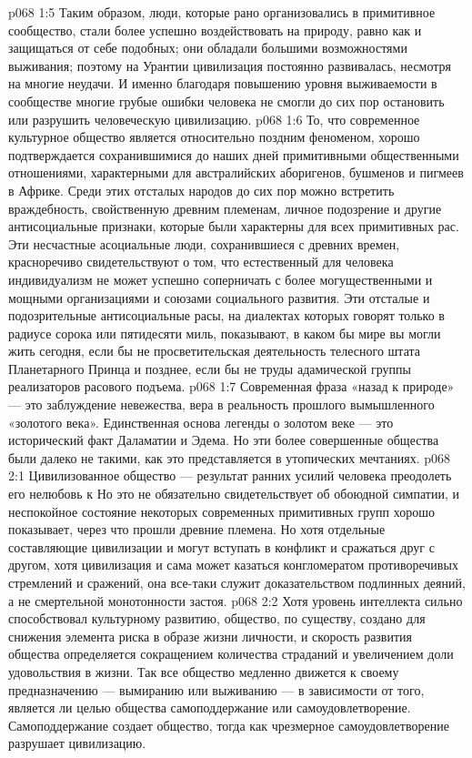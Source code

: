 \vs p068 1:5 Таким образом, люди, которые рано организовались в примитивное сообщество, стали более успешно воздействовать на природу, равно как и защищаться от себе подобных; они обладали большими возможностями выживания; поэтому на Урантии цивилизация постоянно развивалась, несмотря на многие неудачи. И именно благодаря повышению уровня выживаемости в сообществе многие грубые ошибки человека не смогли до сих пор остановить или разрушить человеческую цивилизацию.
\vs p068 1:6 \pc То, что современное культурное общество является относительно поздним феноменом, хорошо подтверждается сохранившимися до наших дней примитивными общественными отношениями, характерными для австралийских аборигенов, бушменов и пигмеев в Африке. Среди этих отсталых народов до сих пор можно встретить враждебность, свойственную древним племенам, личное подозрение и другие антисоциальные признаки, которые были характерны для всех примитивных рас. Эти несчастные асоциальные люди, сохранившиеся с древних времен, красноречиво свидетельствуют о том, что естественный для человека индивидуализм не может успешно соперничать с более могущественными и мощными организациями и союзами социального развития. Эти отсталые и подозрительные антисоциальные расы, на диалектах которых говорят только в радиусе сорока или пятидесяти миль, показывают, в каком бы мире вы могли жить сегодня, если бы не просветительская деятельность телесного штата Планетарного Принца и позднее, если бы не труды адамической группы реализаторов расового подъема.
\vs p068 1:7 Современная фраза «назад к природе» --- это заблуждение невежества, вера в реальность прошлого вымышленного «золотого века». Единственная основа легенды о золотом веке --- это исторический факт Даламатии и Эдема. Но эти более совершенные общества были далеко не такими, как это представляется в утопических мечтаниях.
\vs p068 2:1 Цивилизованное общество --- результат ранних усилий человека преодолеть его нелюбовь к  Но это не обязательно свидетельствует об обоюдной симпатии, и неспокойное состояние некоторых современных примитивных групп хорошо показывает, через что прошли древние племена. Но хотя отдельные составляющие цивилизации и могут вступать в конфликт и сражаться друг с другом, хотя цивилизация и сама может казаться конгломератом противоречивых стремлений и сражений, она все\hyp{}таки служит доказательством подлинных деяний, а не смертельной монотонности застоя.
\vs p068 2:2 Хотя уровень интеллекта сильно способствовал культурному развитию, общество, по существу, создано для снижения элемента риска в образе жизни личности, и скорость развития общества определяется сокращением количества страданий и увеличением доли удовольствия в жизни. Так все общество медленно движется к своему предназначению --- вымиранию или выживанию --- в зависимости от того, является ли целью общества самоподдержание или самоудовлетворение. Самоподдержание создает общество, тогда как чрезмерное самоудовлетворение разрушает цивилизацию.
